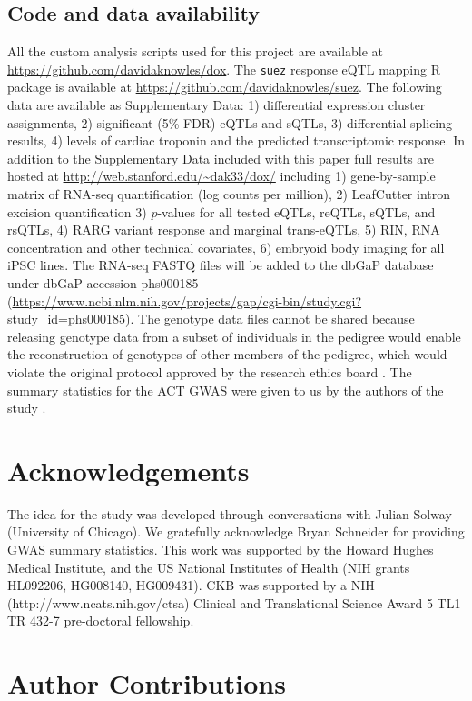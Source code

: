 \documentclass{article}
\begin{document}
\subsection*{Code and data availability}

All the custom analysis scripts used for this project are available at \url{https://github.com/davidaknowles/dox}. 
The \texttt{suez} response eQTL mapping R package is available at \url{https://github.com/davidaknowles/suez}. 
The following data are available as Supplementary Data: 1) differential expression cluster assignments, 2) significant (5\% FDR) eQTLs and sQTLs, 3) differential splicing results, 4) levels of cardiac troponin and the predicted transcriptomic response. 
In addition to the Supplementary Data included with this paper full results are hosted at \url{http://web.stanford.edu/~dak33/dox/} including 1) gene-by-sample matrix of RNA-seq quantification (log counts per million), 2) LeafCutter intron excision quantification 3) $p$-values for all tested eQTLs, reQTLs, sQTLs, and rsQTLs, 4) RARG variant response and marginal trans-eQTLs, 5) RIN, RNA concentration and other technical covariates, 6) embryoid body imaging for all iPSC lines. 
The RNA-seq FASTQ files will be added to the dbGaP database \cite{Tryka2014} under dbGaP accession phs000185
(\url{https://www.ncbi.nlm.nih.gov/projects/gap/cgi-bin/study.cgi?study_id=phs000185}).
The genotype data files cannot be shared because releasing genotype data
from a subset of individuals in the pedigree would enable the reconstruction of
genotypes of other members of the pedigree, which would violate the original
protocol approved by the research ethics board \cite{Livne2015}. 
The summary statistics for the ACT GWAS were given to us by the authors of the study
\cite{Schneider2016}.

\section*{Acknowledgements}

The idea for the study was developed through conversations with Julian Solway (University of Chicago). We gratefully acknowledge Bryan Schneider for providing GWAS summary statistics. This work was supported by the Howard Hughes Medical Institute, and the US National Institutes of Health (NIH grants HL092206, HG008140, HG009431). 
CKB was supported by a NIH (http://www.ncats.nih.gov/ctsa) Clinical and Translational Science Award 5 TL1 TR 432-7 pre-doctoral fellowship.

\section*{Author Contributions}
\end{document}
